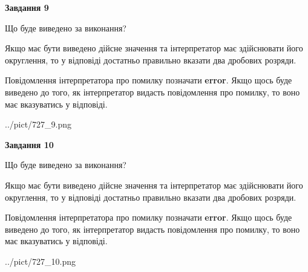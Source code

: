 \documentclass[12pt, ukrainian]{article}
\begin{document}
{\begin {Large}
{\begin {center}\textbf{Завдання 9}\end {center}}\par
Що буде виведено за виконання? \par

Якщо має бути виведено дійсне значення та інтерпретатор має здійснювати його округлення, 
то у відповіді достатньо правильно вказати два дробових розряди.

Повідомлення інтерпретатора про помилку позначати \textbf{error}.
Якщо щось буде виведено до того, як інтерпретатор видасть повідомлення про помилку, 
то воно має вказуватись у відповіді. \par

\begin{center}
	{../pict/727_9.png}
\end{center}
\newpage

{\begin {center}\textbf{Завдання 10}\end {center}}\par
Що буде виведено за виконання? \par

Якщо має бути виведено дійсне значення та інтерпретатор має здійснювати його округлення, 
то у відповіді достатньо правильно вказати два дробових розряди.

Повідомлення інтерпретатора про помилку позначати \textbf{error}.
Якщо щось буде виведено до того, як інтерпретатор видасть повідомлення про помилку, 
то воно має вказуватись у відповіді. \par

\begin{center}
	{../pict/727_10.png}
\end{center}
\newpage

\end {Large}}
\end{document}
